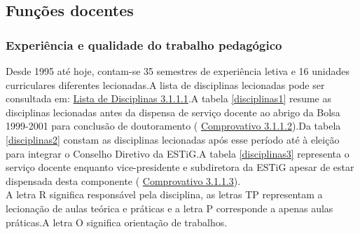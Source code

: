 \documentclass[11pt]{article}
\begin{document}
\subsection{Funções docentes}
\subsubsection{Experiência e qualidade do trabalho pedagógico}Desde 1995 até hoje, contam-se 35 semestres de experiência letiva e 16 unidades curriculares diferentes lecionadas.A lista de disciplinas lecionadas pode ser consultada em: 
\href{run:Disciplinas/Disciplinas.pdf}{Lista de Disciplinas 3.1.1.1}.A tabela 
\ref{disciplinas1} resume as disciplinas lecionadas antes da dispensa de serviço docente ao abrigo da Bolsa 1999-2001 para conclusão de doutoramento (
\href{run:Bolsas/DispensaProdep.pdf}{Comprovativo 3.1.1.2}).Da tabela 
\ref{disciplinas2} constam as disciplinas lecionadas após esse período até à eleição para integrar o Conselho Diretivo da ESTiG.A tabela 
\ref{disciplinas3} representa o serviço docente enquanto vice-presidente e subdiretora da ESTiG apesar de estar dispensada desta componente (
\href{run:Bolsas/DispensaSubdiretora.pdf}{Comprovativo 3.1.1.3}). \\
A letra R significa responsável pela disciplina, as letras TP representam a lecionação de aulas teórica e práticas e a letra P corresponde a apenas aulas práticas.A letra O significa orientação de trabalhos. 
\end{document}
